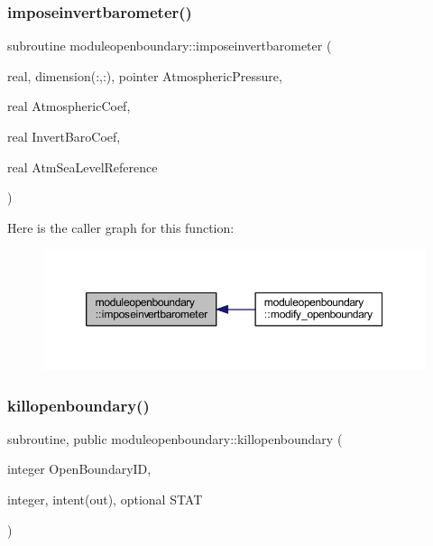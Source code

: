 \subsubsection{\texorpdfstring{imposeinvertbarometer()}{imposeinvertbarometer()}}
{\footnotesize\ttfamily subroutine moduleopenboundary\+::imposeinvertbarometer (\begin{DoxyParamCaption}\item[{real, dimension(\+:,\+:), pointer}]{Atmospheric\+Pressure,  }\item[{real}]{Atmospheric\+Coef,  }\item[{real}]{Invert\+Baro\+Coef,  }\item[{real}]{Atm\+Sea\+Level\+Reference }\end{DoxyParamCaption})\hspace{0.3cm}{\ttfamily [private]}}

Here is the caller graph for this function\+:\nopagebreak
\begin{figure}[H]
\begin{center}
\leavevmode
\includegraphics[width=350pt]{namespacemoduleopenboundary_a286febb2e6ff9645adfa5b2e89882bcb_icgraph}
\end{center}
\end{figure}
\mbox{\label{namespacemoduleopenboundary_aeb84e486854c5a1124aae3804680b09b}} 
\subsubsection{\texorpdfstring{killopenboundary()}{killopenboundary()}}
{\footnotesize\ttfamily subroutine, public moduleopenboundary\+::killopenboundary (\begin{DoxyParamCaption}\item[{integer}]{Open\+Boundary\+ID,  }\item[{integer, intent(out), optional}]{S\+T\+AT }\end{DoxyParamCaption})}

